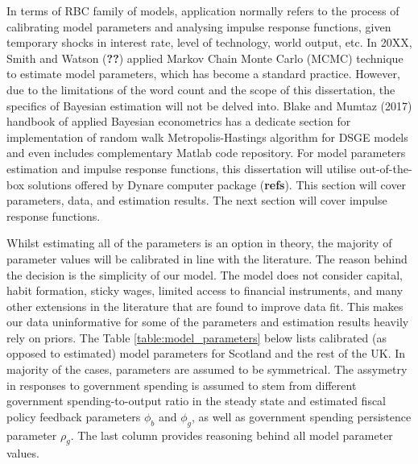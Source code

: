 In terms of RBC family of models, application normally refers to the process of calibrating model parameters and analysing impulse response functions, given temporary shocks in interest rate, level of technology, world output, etc. In 20XX, Smith and Watson (\textbf{??}) applied Markov Chain Monte Carlo (MCMC) technique to estimate model parameters, which has become a standard practice. However, due to the limitations of the word count and the scope of this dissertation, the specifics of Bayesian estimation will not be delved into. Blake and Mumtaz (2017) handbook of applied Bayesian econometrics has a dedicate section for implementation of random walk Metropolis-Hastings algorithm for DSGE models and even includes complementary Matlab code repository. For model parameters estimation and impulse response functions, this dissertation will utilise out-of-the-box solutions offered by Dynare computer package (\textbf{refs}). This section will cover parameters, data, and estimation results. The next section will cover impulse response functions.

Whilst estimating all of the parameters is an option in theory, the majority of parameter values will be calibrated in line with the literature. The reason behind the decision is the simplicity of our model. The model does not consider capital, habit formation, sticky wages, limited access to financial instruments, and many other extensions in the literature that are found to improve data fit. This makes our data uninformative for some of the parameters and estimation results heavily rely on priors. The Table \ref{table:model_parameters} below lists calibrated (as opposed to estimated) model parameters for Scotland and the rest of the UK. In majority of the cases, parameters are assumed to be symmetrical. The assymetry in responses to government spending is assumed to stem from different government spending-to-output ratio in the steady state and estimated fiscal policy feedback parameters $\phi_b$ and $\phi_g$, as well as government spending persistence parameter $\rho_g$. The last column provides reasoning behind all model parameter values.


